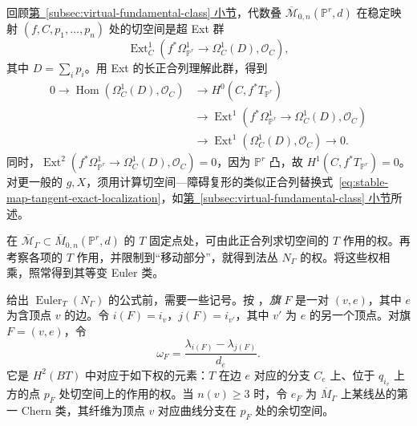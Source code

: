回顾\hyperref[subsec:virtual-fundamental-class]{第~\ref*{subsec:virtual-fundamental-class} 小节}，代数叠 $\overline{\mathcal M}_{0,n}(\mathbb P^r,d)$ 在稳定映射 $(f,C,p_1,\ldots,p_n)$ 处的切空间是超 Ext 群
\[
\operatorname{Ext}^1_C(f^*\Omega^1_{\mathbb P^r}\longrightarrow\Omega_C^1(D),\mathcal O_C),
\]
其中 $D=\sum_ip_i$。用 Ext 的长正合列理解此群，得到
\begin{equation}\label{eq:stable-map-tangent-exact-localization}
\begin{aligned}
0\longrightarrow\operatorname{Hom}(\Omega_C^1(D),\mathcal O_C)
&\longrightarrow H^0(C,f^*T_{\mathbb P^r})\\
&\longrightarrow\operatorname{Ext}^1(f^*\Omega^1_{\mathbb P^r}\to\Omega_C^1(D),\mathcal O_C)\\
&\longrightarrow\operatorname{Ext}^1(\Omega_C^1(D),\mathcal O_C)\longrightarrow0.
\end{aligned}
\end{equation}
同时，$\operatorname{Ext}^2(f^*\Omega^1_{\mathbb P^r}\to\Omega_C^1(D),\mathcal O_C)=0$，因为 $\mathbb P^r$ 凸，故 $H^1(C,f^*T_{\mathbb P^r})=0$。对更一般的 $g,X$，须用计算切空间—障碍复形的类似正合列替换式~\eqref{eq:stable-map-tangent-exact-localization}，如\hyperref[subsec:virtual-fundamental-class]{第~\ref*{subsec:virtual-fundamental-class} 小节}所述。

在 $\overline{\mathcal M}_\Gamma\subset\overline M_{0,n}(\mathbb P^r,d)$ 的 $T$ 固定点处，可由此正合列求切空间的 $T$ 作用的权。再考察各项的 $T$ 作用，并限制到“移动部分”，就得到法丛 $N_\Gamma$ 的权。将这些权相乘，照常得到其等变 Euler 类。

给出 $\operatorname{Euler}_T(N_\Gamma)$ 的公式前，需要一些记号。按 ，\emph{旗} $F$ 是一对 $(v,e)$，其中 $e$ 为含顶点 $v$ 的边。令 $i(F)=i_v$，$j(F)=i_{v'}$，其中 $v'$ 为 $e$ 的另一个顶点。对旗 $F=(v,e)$，令
\[
\omega_F=\frac{\lambda_{i(F)}-\lambda_{j(F)}}{d_e}.
\]
它是 $H^2(BT)$ 中对应于如下权的元素：$T$ 在边 $e$ 对应的分支 $C_e$ 上、位于 $q_{i_v}$ 上方的点 $p_F$ 处切空间上的作用的权。当 $n(v)\ge3$ 时，令 $e_F$ 为 $\overline M_\Gamma$ 上某线丛的第一 Chern 类，其纤维为顶点 $v$ 对应曲线分支在 $p_F$ 处的余切空间。

